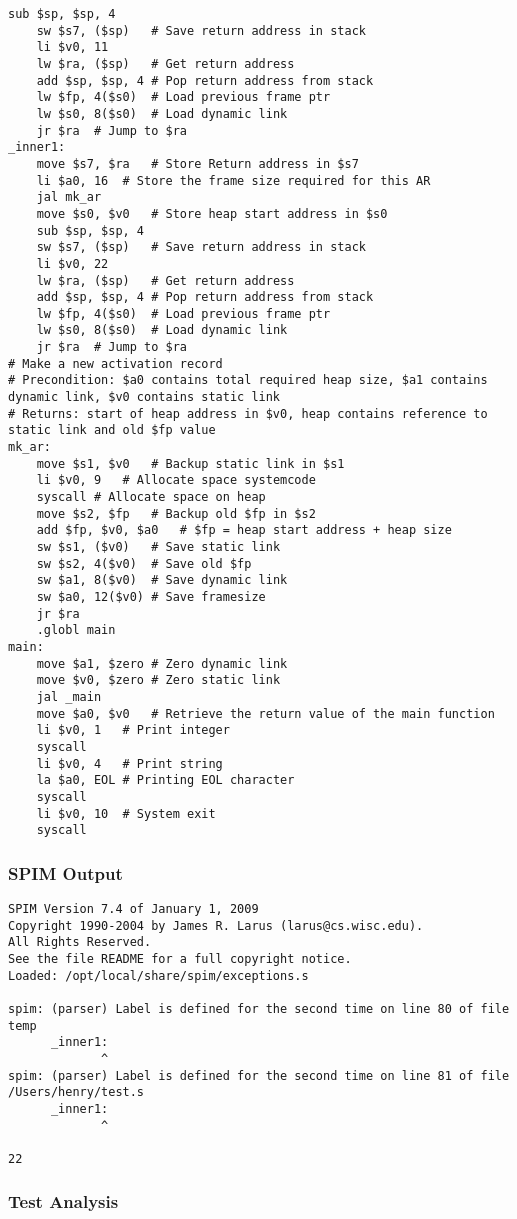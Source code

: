 \begin{lstlisting}[showstringspaces=false,breaklines=true,backgroundcolor=\color{light-gray}, captionpos=b]
	sub $sp, $sp, 4
	sw $s7, ($sp)	# Save return address in stack
	li $v0, 11
	lw $ra, ($sp)	# Get return address
	add $sp, $sp, 4	# Pop return address from stack
	lw $fp, 4($s0)	# Load previous frame ptr
	lw $s0, 8($s0)	# Load dynamic link
	jr $ra	# Jump to $ra
_inner1:
	move $s7, $ra	# Store Return address in $s7
	li $a0, 16	# Store the frame size required for this AR
	jal mk_ar
	move $s0, $v0	# Store heap start address in $s0
	sub $sp, $sp, 4
	sw $s7, ($sp)	# Save return address in stack
	li $v0, 22
	lw $ra, ($sp)	# Get return address
	add $sp, $sp, 4	# Pop return address from stack
	lw $fp, 4($s0)	# Load previous frame ptr
	lw $s0, 8($s0)	# Load dynamic link
	jr $ra	# Jump to $ra
# Make a new activation record
# Precondition: $a0 contains total required heap size, $a1 contains dynamic link, $v0 contains static link
# Returns: start of heap address in $v0, heap contains reference to static link and old $fp value
mk_ar:
	move $s1, $v0	# Backup static link in $s1
	li $v0, 9	# Allocate space systemcode
	syscall	# Allocate space on heap
	move $s2, $fp	# Backup old $fp in $s2
	add $fp, $v0, $a0	# $fp = heap start address + heap size
	sw $s1, ($v0)	# Save static link
	sw $s2, 4($v0)	# Save old $fp
	sw $a1, 8($v0)	# Save dynamic link
	sw $a0, 12($v0)	# Save framesize
	jr $ra
	.globl main
main:
	move $a1, $zero	# Zero dynamic link
	move $v0, $zero	# Zero static link
	jal _main
	move $a0, $v0	# Retrieve the return value of the main function
	li $v0, 1	# Print integer
	syscall
	li $v0, 4	# Print string
	la $a0, EOL	# Printing EOL character
	syscall
	li $v0, 10	# System exit
	syscall

\end{lstlisting}\subsubsection{SPIM Output}
\begin{verbatim}
SPIM Version 7.4 of January 1, 2009
Copyright 1990-2004 by James R. Larus (larus@cs.wisc.edu).
All Rights Reserved.
See the file README for a full copyright notice.
Loaded: /opt/local/share/spim/exceptions.s

spim: (parser) Label is defined for the second time on line 80 of file temp
	  _inner1:
	         ^
spim: (parser) Label is defined for the second time on line 81 of file /Users/henry/test.s
	  _inner1:
	         ^

22
\end{verbatim}\subsubsection{Test Analysis}

